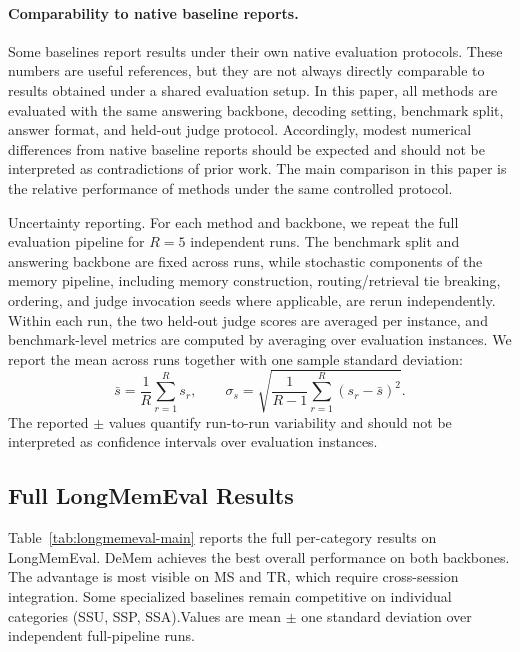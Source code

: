 \documentclass{article}
\theoremstyle{plain}
\theoremstyle{definition}
\theoremstyle{remark}
\begin{document}
\paragraph{Comparability to native baseline reports.}
Some baselines report results under their own native evaluation protocols. These numbers are useful references, but they are not always directly comparable to results obtained under a shared evaluation setup. In this paper, all methods are evaluated with the same answering backbone, decoding setting, benchmark split, answer format, and held-out judge protocol. Accordingly, modest numerical differences from native baseline reports should be expected and should not be interpreted as contradictions of prior work. The main comparison in this paper is the relative performance of methods under the same controlled protocol.

Uncertainty reporting. For each method and backbone, we repeat the full
evaluation pipeline for \(R=5\) independent runs. The benchmark split and
answering backbone are fixed across runs, while stochastic components of
the memory pipeline, including memory construction, routing/retrieval tie
breaking, ordering, and judge invocation seeds where applicable, are rerun
independently. Within each run, the two held-out judge scores are averaged
per instance, and benchmark-level metrics are computed by averaging over
evaluation instances. We report the mean across runs together with one
sample standard deviation:
\[
\bar{s}=\frac{1}{R}\sum_{r=1}^{R}s_r,\qquad
\sigma_s=\sqrt{\frac{1}{R-1}\sum_{r=1}^{R}(s_r-\bar{s})^2}.
\]
The reported \(\pm\) values quantify run-to-run variability and should not
be interpreted as confidence intervals over evaluation instances.

\subsection{Full LongMemEval Results}
\label{app:longmemeval-table}

Table~\ref{tab:longmemeval-main} reports the full per-category results on LongMemEval.
DeMem achieves the best overall performance on both backbones.
The advantage is most visible on MS and TR, which require cross-session integration.
Some specialized baselines remain competitive on individual categories (SSU, SSP, SSA).Values are mean \(\pm\) one standard deviation over independent full-pipeline runs.
\end{document}
